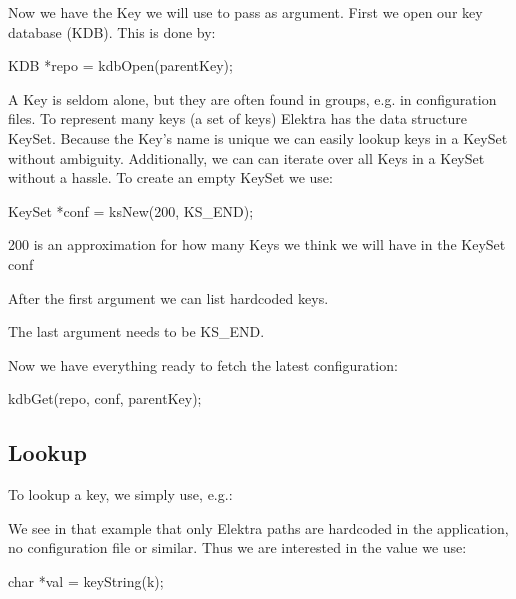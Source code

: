 Now we have the {\ttfamily Key} we will use to pass as argument. First we open our key database (K\+D\+B). This is done by\+: \begin{DoxyVerb}    KDB *repo = kdbOpen(parentKey);
\end{DoxyVerb}


A {\ttfamily Key} is seldom alone, but they are often found in groups, e.\+g. in configuration files. To represent many keys (a set of keys) Elektra has the data structure {\ttfamily Key\+Set}. Because the {\ttfamily Key}'s name is unique we can easily lookup keys in a {\ttfamily Key\+Set} without ambiguity. Additionally, we can can iterate over all {\ttfamily Key}s in a {\ttfamily Key\+Set} without a hassle. To create an empty {\ttfamily Key\+Set} we use\+: \begin{DoxyVerb}    KeySet *conf = ksNew(200,
            KS_END);
\end{DoxyVerb}



\begin{DoxyItemize}
\item 200 is an approximation for how many {\ttfamily Key}s we think we will have in the {\ttfamily Key\+Set} conf
\item After the first argument we can list hardcoded keys.
\item The last argument needs to be {\ttfamily K\+S\+\_\+\+E\+N\+D}.
\end{DoxyItemize}

Now we have everything ready to fetch the latest configuration\+: \begin{DoxyVerb}    kdbGet(repo, conf, parentKey);
\end{DoxyVerb}


\subsection*{Lookup}

To lookup a key, we simply use, e.\+g.\+: 


We see in that example that only Elektra paths are hardcoded in the application, no configuration file or similar. Thus we are interested in the value we use\+: \begin{DoxyVerb}    char *val = keyString(k);
\end{DoxyVerb}


